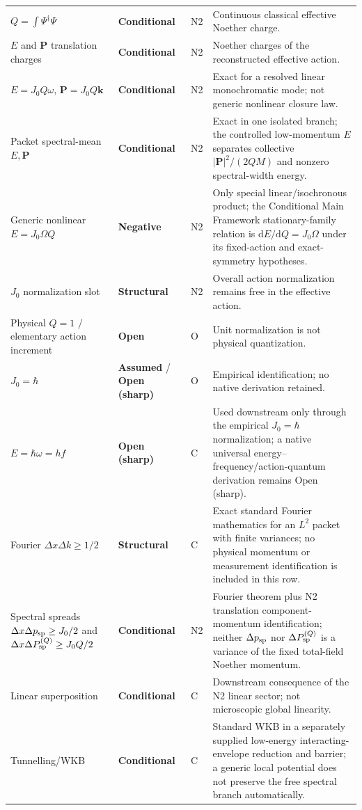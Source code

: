 \documentclass[11pt]{article}
\theoremstyle{definition}
\newcommand{\dd}{\mathrm{d}}
\newcommand{\statusStructural}{\textcolor{blue!55!black}{\textbf{Structural}}}
\newcommand{\statusAssumed}{\textcolor{orange!80!black}{\textbf{Assumed}}}
\newcommand{\statusConditional}{\textcolor{yellow!60!black}{\textbf{Conditional}}}
\newcommand{\statusNegative}{\textcolor{red!65!black}{\textbf{Negative}}}
\newcommand{\statusOpen}{\textcolor{red!75!black}{\textbf{Open}}}
\newcommand{\statusSharpOpen}{\textcolor{red!35!black}{\textbf{Open (sharp)}}}
\begin{document}
\begin{longtable}{P{3.7cm}P{2.7cm}P{1.45cm}P{6.6cm}}
$Q=\int\Psi^\dagger\Psi$ & \statusConditional{} & N2 & Continuous classical effective Noether charge.\\
$E$ and $\mathbf P$ translation charges & \statusConditional{} & N2 & Noether charges of the reconstructed effective action.\\
$E=J_0Q\omega$, $\mathbf P=J_0Q\mathbf k$ & \statusConditional{} & N2 & Exact for a resolved linear monochromatic mode; not generic nonlinear closure law.\\
Packet spectral-mean $E,\mathbf P$ & \statusConditional{} & N2 & Exact in one isolated branch; the controlled low-momentum $E$ separates collective $|\mathbf P|^2/(2QM)$ and nonzero spectral-width energy.\\
Generic nonlinear $E=J_0\Omega Q$ & \statusNegative{} & N2 & Only special linear/isochronous product; the Conditional Main Framework stationary-family relation is $\dd E/\dd Q=J_0\Omega$ under its fixed-action and exact-symmetry hypotheses.\\
$J_0$ normalization slot & \statusStructural{} & N2 & Overall action normalization remains free in the effective action.\\
Physical $Q=1$ / elementary action increment & \statusOpen{} & O & Unit normalization is not physical quantization.\\
$J_0=\hbar$ & \statusAssumed{} / \statusSharpOpen{} & O & Empirical identification; no native derivation retained.\\
$E=\hbar\omega=hf$ & \statusSharpOpen{} & C & Used downstream only through the empirical $J_0=\hbar$ normalization; a native universal energy--frequency/action-quantum derivation remains Open (sharp).\\
Fourier $\Delta x\Delta k\geq1/2$ & \statusStructural{} & C & Exact standard Fourier mathematics for an $L^2$ packet with finite variances; no physical momentum or measurement identification is included in this row.\\
Spectral spreads $\Delta x\Delta p_{\rm sp}\geq J_0/2$ and $\Delta x\Delta P^{(Q)}_{\rm sp}\geq J_0Q/2$ & \statusConditional{} & N2 & Fourier theorem plus N2 translation component-momentum identification; neither $\Delta p_{\rm sp}$ nor $\Delta P^{(Q)}_{\rm sp}$ is a variance of the fixed total-field Noether momentum.\\
Linear superposition & \statusConditional{} & C & Downstream consequence of the N2 linear sector; not microscopic global linearity.\\
Tunnelling/WKB & \statusConditional{} & C & Standard WKB in a separately supplied low-energy interacting-envelope reduction and barrier; a generic local potential does not preserve the free spectral branch automatically.\\

\end{longtable}
\end{document}
